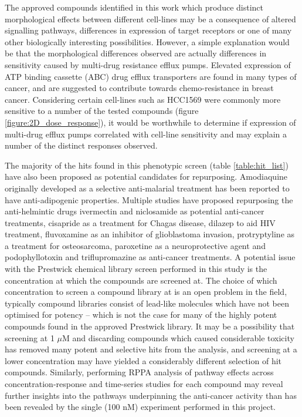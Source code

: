 \documentclass[a4paper,11pt,twoside,openright]{scrbook}
\begin{document}
The approved compounds identified in this work which produce distinct morphological effects between different 
cell-lines may be a consequence of altered signalling pathways, differences in expression of target receptors or one of 
many other biologically interesting possibilities.
However, a simple explanation would be that the morphological differences observed are actually differences in 
sensitivity caused by multi-drug resistance efflux pumps.
Elevated expression of ATP binding cassette (ABC) drug efflux transporters are found in many types of cancer, and are 
suggested to contribute towards chemo-resistance in breast cancer. \cite{Kuo2007}
Considering certain cell-lines such as HCC1569 were commonly more sensitive to a number of the tested compounds (figure 
\ref{figure:2D_dose_response}), it would be worthwhile to determine if expression of multi-drug efflux pumps correlated 
with cell-line sensitivity and may explain a number of the distinct responses observed.

The majority of the hits found in this phenotypic screen (table \ref{table:hit_list}) have also been proposed as 
potential candidates for repurposing.
Amodiaquine originally developed as a selective anti-malarial treatment has been reported to have anti-adipogenic 
properties. \cite{Kim2017}
Multiple studies have proposed repurposing the anti-helmintic drugs ivermectin and niclosamide as potential anti-cancer 
treatments, \cite{Juarez2018,Wu2018} cisapride as a treatment for Chagas disease, \cite{Dietrich2018} dilazep to aid 
HIV treatment,\cite{Zeng2014} fluvoxamine as an inhibitor of glioblastoma invasion, \cite{Hayashi2016} protryptyline as 
a treatment for osteosarcoma, \cite{Su2016} paroxetine as a neuroprotective agent \cite{Steiner2015,Meulendyke2014} and 
podophyllotoxin and triflupromazine as anti-cancer treatments. \cite{Wu2018,Rigas1981}
A potential issue with the Prestwick chemical library screen performed in this study is the concentration at which the 
compounds are screened at.
The choice of which concentration to screen a compound library at is an open problem in the field, typically compound 
libraries consist of lead-like molecules which have not been optimised for potency -- which is not the case for many of 
the highly potent compounds found in the approved Prestwick library.
It may be a possibility that screening at 1 $\mu$M and discarding compounds which caused considerable toxicity has 
removed many potent and selective hits from the analysis, and screening at a lower concentration may have yielded a 
considerably different selection of hit compounds.
Similarly, performing RPPA analysis of pathway effects across concentration-response and time-series studies for each 
compound may reveal further insights into the pathways underpinning the anti-cancer activity than has been revealed by 
the single (100 nM) experiment performed in this project.
\end{document}
